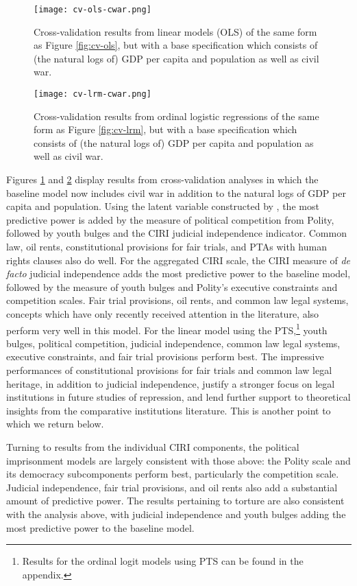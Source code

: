 \documentclass[11pt]{article}
\begin{document}
\begin{figure}[!htpb]
\centering
\texttt{[image: cv-ols-cwar.png]}
\caption{Cross-validation results from linear models (OLS) of the same form as Figure \ref{fig:cv-ols}, but with a base specification which consists of (the natural logs of) GDP per capita and population as well as civil war.}
\label{fig:cv-ols-cwar}
\end{figure}

\begin{figure}[!htpb]
\centering
\texttt{[image: cv-lrm-cwar.png]}
\caption{Cross-validation results from ordinal logistic regressions of the same form as Figure \ref{fig:cv-lrm}, but with a base specification which consists of (the natural logs of) GDP per capita and population as well as civil war.}
\label{fig:cv-lrm-cwar}
\end{figure}

Figures \ref{fig:cv-ols-cwar} and \ref{fig:cv-lrm-cwar} display results from cross-validation analyses in which the baseline model now includes civil war in addition to the natural logs of GDP per 
capita and population. Using the latent variable constructed by \citet{Fariss2013}, the most predictive power is added by the measure of political competition from Polity, followed by youth bulges and the CIRI judicial independence indicator. Common law, oil rents, constitutional provisions for fair trials, and PTAs with human rights clauses also do well. For the aggregated CIRI scale, the CIRI measure of {\it de facto} judicial independence adds the most predictive power to the baseline model, followed by the measure of youth bulges and Polity's executive constraints and competition scales. Fair trial provisions, oil rents, and common law legal systems, concepts which have only recently received attention in the literature, also perform very well in this model. For the linear model using the PTS,\footnote{Results for the ordinal logit models using PTS can be found in the appendix.} youth bulges, political competition, judicial independence, common law legal systems, executive constraints, and fair trial provisions perform best. The impressive performances of constitutional provisions for fair trials and common law legal heritage, in addition to judicial independence, justify a stronger focus on legal institutions in future studies of repression, and lend further support to theoretical insights from the comparative institutions literature. This is another point to which we return below.

Turning to results from the individual CIRI components, the political imprisonment models are largely consistent with those above: the Polity scale and its democracy subcomponents perform best, particularly the competition scale. Judicial independence, fair trial provisions, and oil rents also add a substantial amount of predictive power. The results pertaining to torture are also consistent with the analysis above, with judicial independence and youth bulges adding the most predictive power to the baseline model. 
\end{document}
